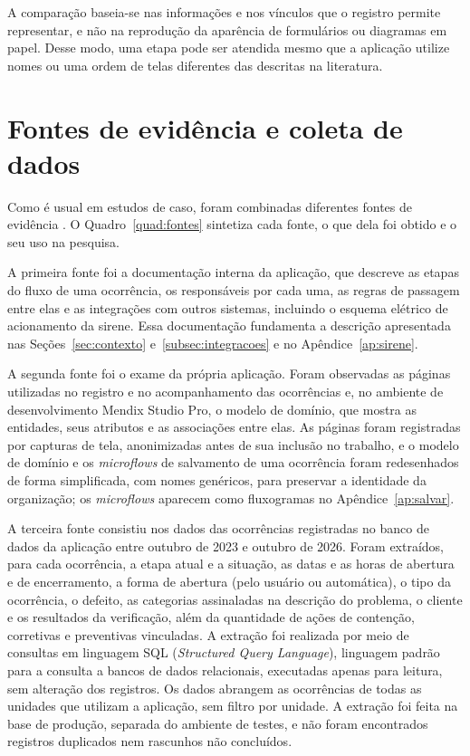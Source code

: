 A comparação baseia-se nas informações e nos vínculos que o registro permite representar, e não na reprodução da aparência de formulários ou diagramas em papel. Desse modo, uma etapa pode ser atendida mesmo que a aplicação utilize nomes ou uma ordem de telas diferentes das descritas na literatura.

\section{Fontes de evidência e coleta de dados}
\label{sec:fontes-coleta}

Como é usual em estudos de caso, foram combinadas diferentes fontes de evidência \cite[p.~93, 95]{bhattacherjee2012}. O Quadro~\ref{quad:fontes} sintetiza cada fonte, o que dela foi obtido e o seu uso na pesquisa.

A primeira fonte foi a documentação interna da aplicação, que descreve as etapas do fluxo de uma ocorrência, os responsáveis por cada uma, as regras de passagem entre elas e as integrações com outros sistemas, incluindo o esquema elétrico de acionamento da sirene. Essa documentação fundamenta a descrição apresentada nas Seções~\ref{sec:contexto} e~\ref{subsec:integracoes} e no Apêndice~\ref{ap:sirene}.

A segunda fonte foi o exame da própria aplicação. Foram observadas as páginas utilizadas no registro e no acompanhamento das ocorrências e, no ambiente de desenvolvimento Mendix Studio Pro, o modelo de domínio, que mostra as entidades, seus atributos e as associações entre elas. As páginas foram registradas por capturas de tela, anonimizadas antes de sua inclusão no trabalho, e o modelo de domínio e os \textit{microflows} de salvamento de uma ocorrência foram redesenhados de forma simplificada, com nomes genéricos, para preservar a identidade da organização; os \textit{microflows} aparecem como fluxogramas no Apêndice~\ref{ap:salvar}.

A terceira fonte consistiu nos dados das ocorrências registradas no banco de dados da aplicação entre outubro de 2023 e outubro de 2026. Foram extraídos, para cada ocorrência, a etapa atual e a situação, as datas e as horas de abertura e de encerramento, a forma de abertura (pelo usuário ou automática), o tipo da ocorrência, o defeito, as categorias assinaladas na descrição do problema, o cliente e os resultados da verificação, além da quantidade de ações de contenção, corretivas e preventivas vinculadas. A extração foi realizada por meio de consultas em linguagem SQL (\textit{Structured Query Language}), linguagem padrão para a consulta a bancos de dados relacionais, executadas apenas para leitura, sem alteração dos registros. Os dados abrangem as ocorrências de todas as unidades que utilizam a aplicação, sem filtro por unidade. A extração foi feita na base de produção, separada do ambiente de testes, e não foram encontrados registros duplicados nem rascunhos não concluídos.

